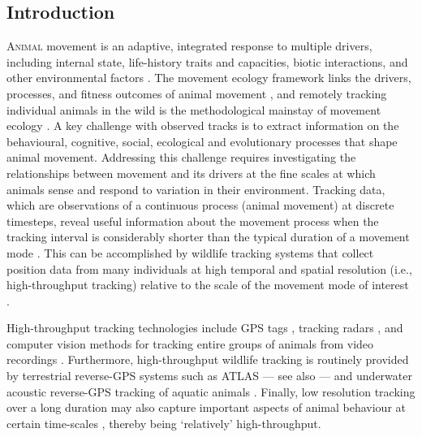 
\begin{refsection}[sorting=nyt]

    \section*{Introduction}
    
    \lettrine{A}{nimal} movement is an adaptive, integrated response to multiple drivers, including internal state, life-history traits and capacities, biotic interactions, and other environmental factors \citep{nathan2008a, holyoak2008}.
    The movement ecology framework links the drivers, processes, and fitness outcomes of animal movement \citep{nathan2008a}, and remotely tracking individual animals in the wild is the methodological mainstay of movement ecology \citep{wikelski2007,nathan2008a,hussey2015,kays2015}.
    A key challenge with observed tracks is to extract information on the behavioural, cognitive, social, ecological and evolutionary processes that shape animal movement.
    Addressing this challenge requires investigating the relationships between movement and its drivers at the fine scales at which animals sense and respond to variation in their environment. 
    Tracking data, which are observations of a continuous process (animal movement) at discrete timesteps, reveal useful information about the movement process when the tracking interval is considerably shorter than the typical duration of a movement mode \citep{nathan2008a, noonan2019, getz2008}.
    This can be accomplished by wildlife tracking systems that collect position data from many individuals at high temporal and spatial resolution (i.e., high-throughput tracking) relative to the scale of the movement mode of interest \citep{getz2008}.

    High-throughput tracking technologies include GPS tags \citep{strandburg-peshkin2015, papageorgiou2019, harel2016, klarevas-irby2021}, tracking radars \citep{horvitz2014}, and computer vision methods for tracking entire groups of animals from video recordings \citep{rathore2020, perez-escudero2014}. 
    Furthermore, high-throughput wildlife tracking is routinely provided by terrestrial reverse-GPS systems such as ATLAS \citep[Advanced Tracking and Localization of Animals in real-life Systems:][]{toledo2014, weiser2016, toledo2016,toledo2020} --- see also \citep{maccurdy2009, maccurdy2019} --- and underwater acoustic reverse-GPS tracking of aquatic animals \citep{baktoft2019, baktoft2017, jung2015, aspillaga2021, aspillaga2021a}.
    Finally, low resolution tracking over a long duration may also capture important aspects of animal behaviour at certain time-scales \citep[e.g. migration, long-range dispersal;][]{getz2008}, thereby being `relatively' high-throughput.


\end{refsection}
